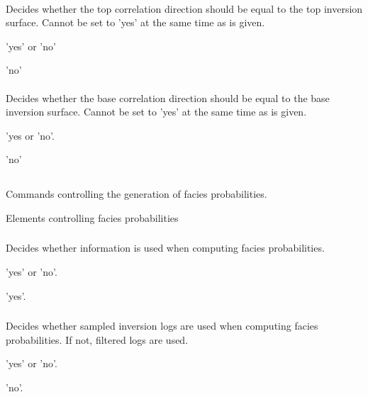 \paragraph{}
 \slist
   \item \Description Decides whether the top correlation direction should be equal to the top inversion surface. Cannot be set to 'yes' at the same time as  is given.
   \item \Argument 'yes' or 'no'
   \item \Default 'no'
 \elist

\paragraph{}
 \slist
   \item \Description Decides whether the base correlation direction should be equal to the base inversion surface. Cannot be set to 'yes' at the same time as  is given.
   \item \Argument 'yes or 'no'.
   \item \Default 'no'
 \elist

\subsection{}
 \slist
   \item \Description Commands controlling the generation of facies probabilities.
   \item \Argument Elements controlling facies probabilities
   \item \Default
 \elist

\subsubsection{}
\slist
  \item \Description Decides whether \vs information is used when computing facies probabilities.
  \item \Argument 'yes' or 'no'.
  \item \Default 'yes'.
\elist

\subsubsection{}
\slist
  \item \Description Decides whether sampled inversion logs are used when computing facies probabilities. If not, filtered logs are used.
  \item \Argument 'yes' or 'no'.
  \item \Default 'no'.
\elist

